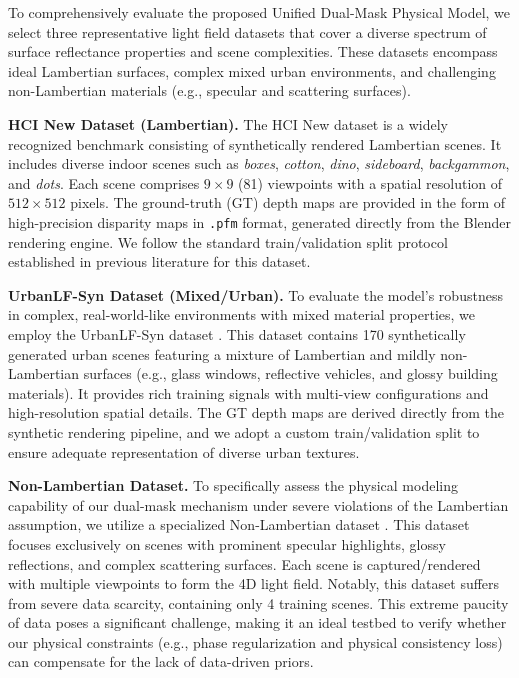 \documentclass[lettersize,journal]{IEEEtran}
\begin{document}
To comprehensively evaluate the proposed Unified Dual-Mask Physical Model, we select three representative light field datasets that cover a diverse spectrum of surface reflectance properties and scene complexities. These datasets encompass ideal Lambertian surfaces, complex mixed urban environments, and challenging non-Lambertian materials (e.g., specular and scattering surfaces). 

\textbf{HCI New Dataset (Lambertian).} The HCI New dataset \cite{ng2005} is a widely recognized benchmark consisting of synthetically rendered Lambertian scenes. It includes diverse indoor scenes such as \textit{boxes}, \textit{cotton}, \textit{dino}, \textit{sideboard}, \textit{backgammon}, and \textit{dots}. Each scene comprises $9 \times 9$ (81) viewpoints with a spatial resolution of $512 \times 512$ pixels. The ground-truth (GT) depth maps are provided in the form of high-precision disparity maps in \texttt{.pfm} format, generated directly from the Blender rendering engine. We follow the standard train/validation split protocol established in previous literature \cite{wanner2014} for this dataset.

\textbf{UrbanLF-Syn Dataset (Mixed/Urban).} To evaluate the model's robustness in complex, real-world-like environments with mixed material properties, we employ the UrbanLF-Syn dataset \cite{blinn1977}. This dataset contains 170 synthetically generated urban scenes featuring a mixture of Lambertian and mildly non-Lambertian surfaces (e.g., glass windows, reflective vehicles, and glossy building materials). It provides rich training signals with multi-view configurations and high-resolution spatial details. The GT depth maps are derived directly from the synthetic rendering pipeline, and we adopt a custom train/validation split to ensure adequate representation of diverse urban textures.

\textbf{Non-Lambertian Dataset.} To specifically assess the physical modeling capability of our dual-mask mechanism under severe violations of the Lambertian assumption, we utilize a specialized Non-Lambertian dataset \cite{honauer2016}. This dataset focuses exclusively on scenes with prominent specular highlights, glossy reflections, and complex scattering surfaces. Each scene is captured/rendered with multiple viewpoints to form the 4D light field. Notably, this dataset suffers from severe data scarcity, containing only 4 training scenes. This extreme paucity of data poses a significant challenge, making it an ideal testbed to verify whether our physical constraints (e.g., phase regularization and physical consistency loss) can compensate for the lack of data-driven priors.
\end{document}
